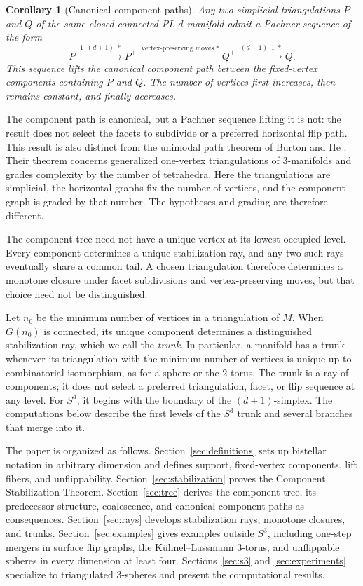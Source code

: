 \documentclass[11pt]{article}
\newtheorem*{corollary*}{Corollary}
\theoremstyle{remark}
\theoremstyle{plain}
\begin{document}
\begin{corollary*}[Canonical component paths]
Any two simplicial triangulations \(P\) and \(Q\) of the same closed
connected PL \(d\)-manifold admit a Pachner sequence of the form
\[
 P
 \xrightarrow{\;1\text{--}(d+1)\;*}
 P^+
 \xrightarrow{\;\text{vertex-preserving moves}\;*}
 Q^+
 \xrightarrow{\;(d+1)\text{--}1\;*}
 Q.
\]
This sequence lifts the canonical component path between the fixed-vertex
components containing \(P\) and \(Q\).  The number of vertices first
increases, then remains constant, and finally decreases.
\end{corollary*}

The component path is canonical, but a Pachner sequence lifting it is not: the
result does not select the facets to subdivide or a preferred horizontal flip
path.  This result is also distinct from the unimodal path theorem of Burton
and He \cite{BH26}.  Their theorem concerns generalized one-vertex
triangulations of \(3\)-manifolds and grades complexity by the number of
tetrahedra.  Here the triangulations are simplicial, the horizontal graphs fix
the number of vertices, and the component graph is graded by that number.
The hypotheses and grading are therefore different.

The component tree need not have a unique vertex at its lowest occupied
level.  Every component determines a unique stabilization ray, and any two
such rays eventually share a common tail.  A chosen triangulation therefore
determines a monotone closure under facet subdivisions and vertex-preserving
moves, but that choice need not be distinguished.

Let \(n_0\) be the minimum number of vertices in a triangulation of \(M\).
When \(G(n_0)\) is connected, its unique component determines a distinguished
stabilization ray, which we call the \emph{trunk}.  In particular, a manifold
has a trunk whenever its triangulation with the minimum number of vertices is
unique up to combinatorial isomorphism, as for a sphere or the \(2\)-torus.
The trunk is a ray of components; it does not select a preferred
triangulation, facet, or flip sequence at any level.  For \(S^d\), it begins
with the boundary of the \((d+1)\)-simplex.  The computations below describe
the first levels of the \(S^3\) trunk and several branches that merge into it.

The paper is organized as follows.  Section~\ref{sec:definitions} sets up
bistellar notation in arbitrary dimension and defines support, fixed-vertex
components, lift fibers, and unflippability.  Section~\ref{sec:stabilization}
proves the Component Stabilization Theorem.  Section~\ref{sec:tree} derives
the component tree, its predecessor structure, coalescence, and canonical
component paths as consequences.  Section~\ref{sec:rays} develops
stabilization rays, monotone closures, and trunks.  Section~\ref{sec:examples}
gives examples outside \(S^3\), including one-step mergers in surface flip
graphs, the K\"uhnel--Lassmann \(3\)-torus, and unflippable spheres in every
dimension at least four.  Sections~\ref{sec:s3} and \ref{sec:experiments}
specialize to triangulated \(3\)-spheres and present the computational results.
\end{document}
